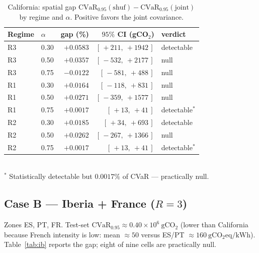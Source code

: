 \documentclass[11pt]{article}
\newcommand{\CVaR}{\mathrm{CVaR}}
\newcommand{\gco}{\mathrm{gCO_2eq/kWh}}
\begin{document}
\begin{table}[h]\centering
\caption{California: spatial gap $\CVaR_{0.95}(\mathrm{shuf})-\CVaR_{0.95}(\mathrm{joint})$ by regime and $\alpha$. Positive favors the joint covariance.}
\label{tab:ca}
\begin{tabular}{@{}llrrl@{}}
\toprule
Regime & $\alpha$ & gap (\%) & $95\%$ CI (gCO$_2$) & verdict \\
\midrule
R3 & 0.30 & $+0.0583$ & $[\,+211,\ +1942\,]$ & detectable \\
R3 & 0.50 & $+0.0357$ & $[\,-532,\ +2177\,]$ & null \\
R3 & 0.75 & $-0.0122$ & $[\,-581,\ +488\,]$ & null \\
R1 & 0.30 & $+0.0164$ & $[\,-118,\ +831\,]$ & null \\
R1 & 0.50 & $+0.0271$ & $[\,-359,\ +1577\,]$ & null \\
R1 & 0.75 & $+0.0017$ & $[\,+13,\ +41\,]$ & detectable$^\ast$ \\
R2 & 0.30 & $+0.0185$ & $[\,+34,\ +693\,]$ & detectable \\
R2 & 0.50 & $+0.0262$ & $[\,-267,\ +1366\,]$ & null \\
R2 & 0.75 & $+0.0017$ & $[\,+13,\ +41\,]$ & detectable$^\ast$ \\
\bottomrule
\end{tabular}
\\[2pt]{\footnotesize $^\ast$ Statistically detectable but $0.0017\%$ of CVaR --- practically null.}
\end{table}

\subsection{Case B --- Iberia + France ($R=3$)}
Zones ES, PT, FR. Test-set $\CVaR_{0.95}\approx 0.40\times 10^{6}\ \mathrm{gCO_2}$ (lower than
California because French intensity is low: mean $\approx 50$ versus ES/PT $\approx 160\ \gco$).
Table~\ref{tab:ib} reports the gap; eight of nine cells are practically null.
\end{document}
